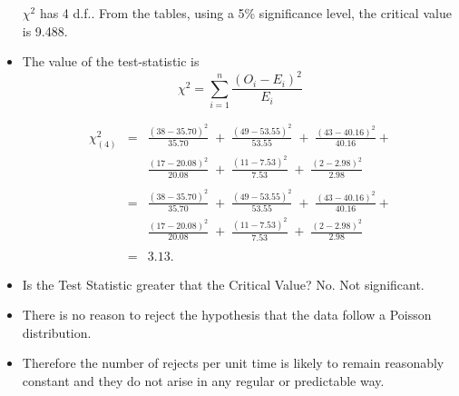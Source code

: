 \documentclass[a4paper,12pt]{article}
\begin{document}
\begin{itemize}
\begin{framed}
		\end{framed}
		
		$\chi^2$ has 4 d.f.. From the tables, using a 5\% significance level, the critical value is 9.488.
		\\
		\item The value of the test-statistic is 
		\[ {\displaystyle \chi^{2} = \sum_{i=1}^{n}  \frac{(O_{i}-E_{i})^{2}}{E_{i}}} \]
		
		
		
		\begin{eqnarray*}
			\chi^2_{(4)} &=& \frac{(38-35.70)^2}{35.70} \;+\; \frac{(49-53.55)^2}{53.55} \;+\; \frac{(43-40.16)^2}{40.16} +\\ 
			& & \frac{(17-20.08)^2}{20.08} \;+\; \frac{(11-7.53)^2}{7.53} \;+\; \frac{(2-2.98)^2}{2.98}\\\\
			&=& \frac{(38-35.70)^2}{35.70} \;+\; \frac{(49-53.55)^2}{53.55} \;+\; \frac{(43-40.16)^2}{40.16} +  \\ 
			& &  \frac{(17-20.08)^2}{20.08} \;+\; \frac{(11-7.53)^2}{7.53} \;+\; \frac{(2-2.98)^2}{2.98}\\\\
			&=& 3.13.
		\end{eqnarray*}


		\item Is the Test Statistic greater that the Critical Value? No. Not significant.
		
		\large 
		\item There is no reason to reject the hypothesis that the data follow a Poisson
		distribution. 
		\item Therefore the number of rejects per unit time is likely to remain
		reasonably constant and they do not arise in any regular or predictable way.
	\end{itemize}
\end{document}
